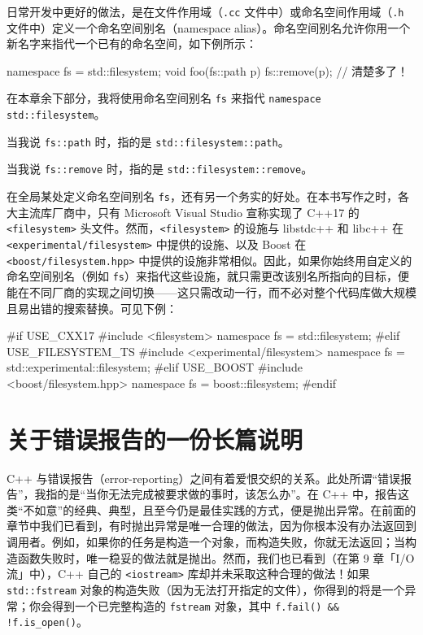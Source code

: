 日常开发中更好的做法，是在文件作用域（\texttt{.cc} 文件中）或命名空间作用域（\texttt{.h} 文件中）定义一个命名空间别名（namespace alias）。命名空间别名允许你用一个新名字来指代一个已有的命名空间，如下例所示：

\begin{codebox}[cpp]
    namespace fs = std::filesystem;
    void foo(fs::path p)
    {
      fs::remove(p); // 清楚多了！
    }
\end{codebox}

在本章余下部分，我将使用命名空间别名 \texttt{fs} 来指代 \texttt{namespace std::\allowbreak{}filesystem}。

当我说 \texttt{fs::\allowbreak{}path} 时，指的是 \texttt{std::\allowbreak{}filesystem::\allowbreak{}path}。

当我说 \texttt{fs::\allowbreak{}remove} 时，指的是 \texttt{std::\allowbreak{}filesystem::\allowbreak{}remove}。

在全局某处定义命名空间别名 \texttt{fs}，还有另一个务实的好处。在本书写作之时，各大主流库厂商中，只有 Microsoft Visual Studio 宣称实现了 C++17 的 \texttt{<filesystem>\allowbreak{}} 头文件。然而，\texttt{<filesystem>\allowbreak{}} 的设施与 libstdc++ 和 libc++ 在 \texttt{<experimental/\allowbreak{}filesystem>\allowbreak{}} 中提供的设施、以及 Boost 在 \texttt{<boost/\allowbreak{}filesystem.\allowbreak{}hpp>\allowbreak{}} 中提供的设施非常相似。因此，如果你始终用自定义的命名空间别名（例如 \texttt{fs}）来指代这些设施，就只需更改该别名所指向的目标，便能在不同厂商的实现之间切换——这只需改动一行，而不必对整个代码库做大规模且易出错的搜索替换。可见下例：

\begin{codebox}[cpp]
    #if USE_CXX17
     #include <filesystem>
     namespace fs = std::filesystem;
    #elif USE_FILESYSTEM_TS
     #include <experimental/filesystem>
     namespace fs = std::experimental::filesystem;
    #elif USE_BOOST
     #include <boost/filesystem.hpp>
     namespace fs = boost::filesystem;
    #endif
\end{codebox}

\section{关于错误报告的一份长篇说明}

C++ 与错误报告（error-reporting）之间有着爱恨交织的关系。此处所谓“错误报告”，我指的是“当你无法完成被要求做的事时，该怎么办”。在 C++ 中，报告这类“不如意”的经典、典型，且至今仍是最佳实践的方式，便是抛出异常。在前面的章节中我们已看到，有时抛出异常是唯一合理的做法，因为你根本没有办法返回到调用者。例如，如果你的任务是构造一个对象，而构造失败，你就无法返回；当构造函数失败时，唯一稳妥的做法就是抛出。然而，我们也已看到（在第 9 章「I/O 流」中），C++ 自己的 \texttt{<iostream>\allowbreak{}} 库却并未采取这种合理的做法！如果 \texttt{std::\allowbreak{}fstream} 对象的构造失败（因为无法打开指定的文件），你得到的将是一个异常；你会得到一个已完整构造的 \texttt{fstream} 对象，其中 \texttt{f.\allowbreak{}fail(\allowbreak{})\allowbreak{} \&\& !f.\allowbreak{}is\_\allowbreak{}open(\allowbreak{})\allowbreak{}}。


